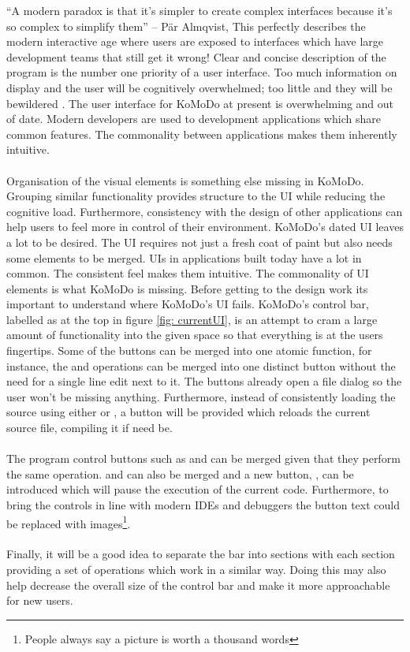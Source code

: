 \graphicspath{ {images/design/} }
``A modern paradox is that it's simpler to create complex interfaces because it's so complex to simplify them'' – P{\"a}r Almqvist, This perfectly describes the modern interactive age where users are exposed to interfaces which have large development teams that still get it wrong! Clear and concise description of the program is the number one priority of a user interface. Too much information on display and the user will be cognitively overwhelmed; too little and they will be bewildered \cite{design_principles}. The user interface for KoMoDo at present is overwhelming and out of date. Modern developers are used to development applications which share common features. The commonality between applications makes them inherently intuitive.\\\\
%
Organisation of the visual elements is something else missing in KoMoDo. Grouping similar functionality provides structure to the UI while reducing the cognitive load. Furthermore, consistency with the design of other applications can help users to feel more in control of their environment\cite{design_principles_two}.
KoMoDo's dated UI leaves a lot to be desired. The UI requires not just a fresh coat of paint but also needs some elements to be merged. UIs in applications built today have a lot in common. The consistent feel makes them intuitive. The commonality of UI elements is what KoMoDo is missing. Before getting to the design work its important to understand where KoMoDo's UI fails.
%
KoMoDo's control bar, labelled as  at the top in figure \ref{fig: currentUI}, is an attempt to cram a large amount of functionality into the given space so that everything is at the users fingertips. Some of the buttons can be merged into one atomic function, for instance, the  and  operations can be merged into one distinct button without the need for a single line edit next to it. The buttons already open a file dialog so the user won't be missing anything. Furthermore, instead of consistently loading the source using either  or , a  button will be provided which reloads the current source file, compiling it if need be.\\\\
%
The program control buttons such as  and  can be merged given that they perform the same operation.  and  can also be merged and a new button, , can be introduced which will pause the execution of the current code. Furthermore, to bring the controls in line with modern IDEs and debuggers the button text could be replaced with images\footnote{People always say a picture is worth a thousand words}.\\\\
%
Finally, it will be a good idea to separate the bar into sections with each section providing a set of operations which work in a similar way. Doing this may also help decrease the overall size of the control bar and make it more approachable for new users.

